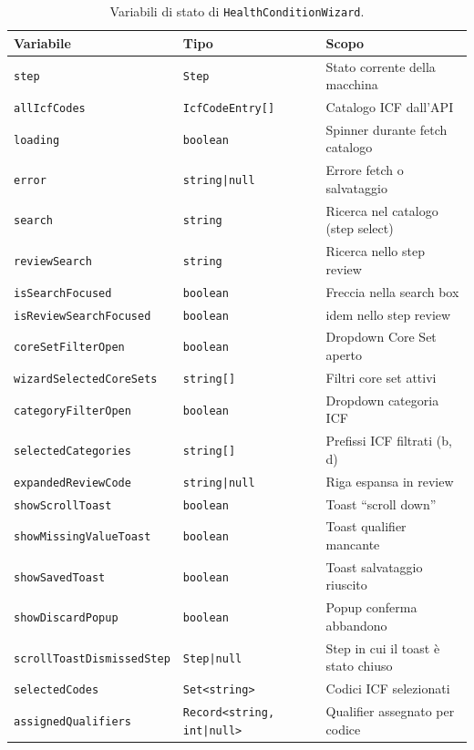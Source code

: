 \documentclass[a4paper,12pt]{article}
\begin{document}
\begin{table}[H]
\centering\small
\caption{Variabili di stato di \texttt{HealthConditionWizard}.}
\begin{tabular}{L{5cm} L{3cm} L{5cm}}
\toprule
\textbf{Variabile} & \textbf{Tipo} & \textbf{Scopo} \\
\midrule
\texttt{step} & \texttt{Step} & Stato corrente della macchina \\
\texttt{allIcfCodes} & \texttt{IcfCodeEntry[]} & Catalogo ICF dall'API \\
\texttt{loading} & \texttt{boolean} & Spinner durante fetch catalogo \\
\texttt{error} & \texttt{string|null} & Errore fetch o salvataggio \\
\texttt{search} & \texttt{string} & Ricerca nel catalogo (step select) \\
\texttt{reviewSearch} & \texttt{string} & Ricerca nello step review \\
\texttt{isSearchFocused} & \texttt{boolean} & Freccia nella search box \\
\texttt{isReviewSearchFocused} & \texttt{boolean} & idem nello step review \\
\texttt{coreSetFilterOpen} & \texttt{boolean} & Dropdown Core Set aperto \\
\texttt{wizardSelectedCoreSets} & \texttt{string[]} & Filtri core set attivi \\
\texttt{categoryFilterOpen} & \texttt{boolean} & Dropdown categoria ICF \\
\texttt{selectedCategories} & \texttt{string[]} & Prefissi ICF filtrati (b, d) \\
\texttt{expandedReviewCode} & \texttt{string|null} & Riga espansa in review \\
\texttt{showScrollToast} & \texttt{boolean} & Toast ``scroll down'' \\
\texttt{showMissingValueToast} & \texttt{boolean} & Toast qualifier mancante \\
\texttt{showSavedToast} & \texttt{boolean} & Toast salvataggio riuscito \\
\texttt{showDiscardPopup} & \texttt{boolean} & Popup conferma abbandono \\
\texttt{scrollToastDismissedStep} & \texttt{Step|null} & Step in cui il toast \`{e} stato chiuso \\
\texttt{selectedCodes} & \texttt{Set<string>} & Codici ICF selezionati \\
\texttt{assignedQualifiers} & \texttt{Record<string, int|null>} & Qualifier assegnato per codice \\
\bottomrule
\end{tabular}
\end{table}
\end{document}
